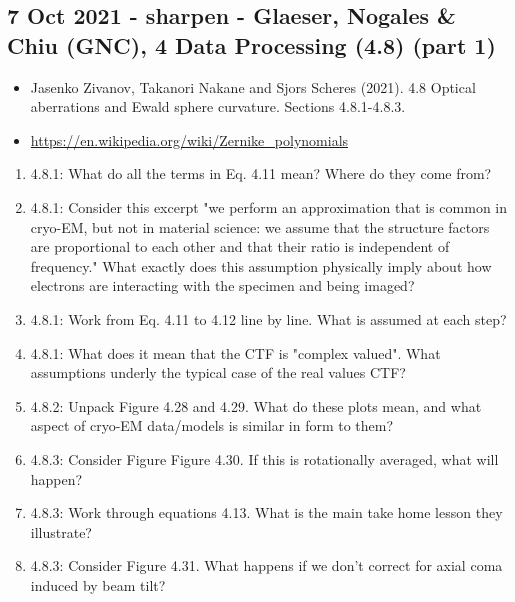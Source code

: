 \documentclass[11pt, oneside]{article}   	%
\begin{document}
\subsection{7 Oct 2021 - sharpen - Glaeser, Nogales \& Chiu (GNC), 4 Data Processing (4.8) (part 1)}
\begin{itemize}
	\item Jasenko Zivanov, Takanori Nakane and Sjors Scheres (2021). 4.8 Optical aberrations and Ewald sphere curvature. Sections 4.8.1-4.8.3.
	\item \url{https://en.wikipedia.org/wiki/Zernike_polynomials}
\end{itemize}
\begin{enumerate}
	\item 4.8.1: What do all the terms in Eq. 4.11 mean? Where do they come from?
	\item 4.8.1: Consider this excerpt "we perform an approximation that is common in cryo-EM, but not in material science: we assume that the structure factors are proportional to each other and that their ratio is independent of frequency." What exactly does this assumption physically imply about how electrons are interacting with the specimen and being imaged?
	\item 4.8.1: Work from Eq. 4.11 to 4.12 line by line. What is assumed at each step?
	\item 4.8.1: What does it mean that the CTF is "complex valued". What assumptions underly the typical case of the real values CTF?
	\item 4.8.2: Unpack Figure 4.28 and 4.29. What do these plots mean, and what aspect of cryo-EM data/models is similar in form to them?
	\item 4.8.3: Consider Figure Figure 4.30. If this is rotationally averaged, what will happen?
	\item 4.8.3: Work through equations 4.13. What is the main take home lesson they illustrate?
	\item 4.8.3: Consider Figure 4.31. What happens if we don't correct for axial coma induced by beam tilt?
\end{enumerate}
\end{document}
